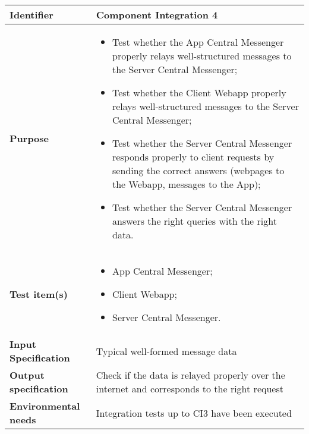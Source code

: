 \begin{center}
\begin{tabular}{lp{}}
\toprule
\textbf{Identifier}		&	Component Integration 4\\
\midrule
\textbf{Purpose}		&	\begin{itemize}
					\item Test whether the App Central Messenger properly relays well-structured messages to the Server Central Messenger;
					\item Test whether the Client Webapp properly relays well-structured messages to the Server Central Messenger;
					\item Test whether the Server Central Messenger responds properly to client requests by sending the correct answers (webpages to the Webapp, messages to the App);
					\item Test whether the Server Central Messenger answers the right queries with the right data.
					\end{itemize}	\\
\textbf{Test item(s)}	&	\begin{itemize}
					\item App Central Messenger;
					\item Client Webapp;
					\item Server Central Messenger.
					\end{itemize}	\\
\textbf{Input Specification}	&	Typical well-formed message data\\
\textbf{Output specification}	&	Check if the data is relayed properly over the internet and corresponds to the right request\\
\textbf{Environmental needs}	&	Integration tests up to CI3 have been executed\\
\bottomrule
\end{tabular}
\end{center}


